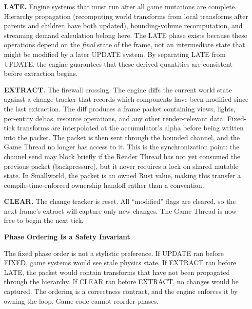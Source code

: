 \documentclass[
  11pt,
  letterpaper,
  DIV=11,
  numbers=noendperiod,
  twoside,
  open=right]{scrreprt}
\begin{document}
\textbf{LATE.} Engine systems that must run after all game mutations are
complete. Hierarchy propagation (recomputing world transforms from local
transforms after parents and children have both updated),
bounding-volume recomputation, and streaming demand calculation belong
here. The LATE phase exists because these operations depend on the
\emph{final} state of the frame, not an intermediate state that might be
modified by a later UPDATE system. By separating LATE from UPDATE, the
engine guarantees that these derived quantities are consistent before
extraction begins.

\textbf{EXTRACT.} The firewall crossing. The engine diffs the current
world state against a change tracker that records which components have
been modified since the last extraction. The diff produces a frame
packet containing views, lights, per-entity deltas, resource operations,
and any other render-relevant data. Fixed-tick transforms are
interpolated at the accumulator's alpha before being written into the
packet. The packet is then sent through the bounded channel, and the
Game Thread no longer has access to it. This is the synchronization
point: the channel send may block briefly if the Render Thread has not
yet consumed the previous packet (backpressure), but it never requires a
lock on shared mutable state. In Smallworld, the packet is an owned Rust
value, making this transfer a compile-time-enforced ownership handoff
rather than a convention.

\textbf{CLEAR.} The change tracker is reset. All ``modified'' flags are
cleared, so the next frame's extract will capture only new changes. The
Game Thread is now free to begin the next tick.

\begin{tcolorbox}[enhanced jigsaw, arc=.35mm, bottomrule=.15mm, breakable, colback=white, colframe=quarto-callout-warning-color-frame, left=2mm, leftrule=.75mm, opacityback=0, rightrule=.15mm, toprule=.15mm]
\begin{minipage}[t]{5.5mm}
\textcolor{quarto-callout-warning-color}{\faExclamationTriangle}
\end{minipage}%
\begin{minipage}[t]{\textwidth - 5.5mm}

\vspace{-3mm}\textbf{Phase Ordering Is a Safety Invariant}\vspace{3mm}

The fixed phase order is not a stylistic preference. If UPDATE ran
before FIXED, game systems would see stale physics state. If EXTRACT ran
before LATE, the packet would contain transforms that have not been
propagated through the hierarchy. If CLEAR ran before EXTRACT, no
changes would be captured. The ordering is a correctness contract, and
the engine enforces it by owning the loop. Game code cannot reorder
phases.

\end{minipage}%
\end{tcolorbox}
\end{document}
